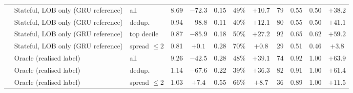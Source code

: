 \begin{table}[p]
\begin{fittable}
\begin{tabular}{lllrcccccccc}
 & Stateful, LOB only (GRU reference) & all & 8.69 & $-72.3$ & 0.15 & 49\% & $+10.7$ & 79 & 0.55 & 0.50 & $+38.2$ \\
 & Stateful, LOB only (GRU reference) & dedup. & 0.94 & $-98.8$ & 0.11 & 40\% & $+12.1$ & 80 & 0.55 & 0.50 & $+41.1$ \\
 & Stateful, LOB only (GRU reference) & top decile & 0.87 & $-85.9$ & 0.18 & 50\% & $+27.2$ & 92 & 0.65 & 0.62 & $+59.2$ \\
 & Stateful, LOB only (GRU reference) & spread $\le 2$ & 0.81 & $+0.1$ & 0.28 & 70\% & $+0.8$ & 29 & 0.51 & 0.46 & $+3.8$ \\
 & Oracle (realised label) & all & 9.26 & $-42.5$ & 0.28 & 48\% & $+39.1$ & 74 & 0.92 & 1.00 & $+63.9$ \\
 & Oracle (realised label) & dedup. & 1.14 & $-67.6$ & 0.22 & 39\% & $+36.3$ & 82 & 0.91 & 1.00 & $+61.4$ \\
 & Oracle (realised label) & spread $\le 2$ & 1.03 & $+7.4$ & 0.55 & 66\% & $+8.7$ & 36 & 0.89 & 1.00 & $+11.5$ \\
\bottomrule
\end{tabular}\end{fittable}
\end{table}
